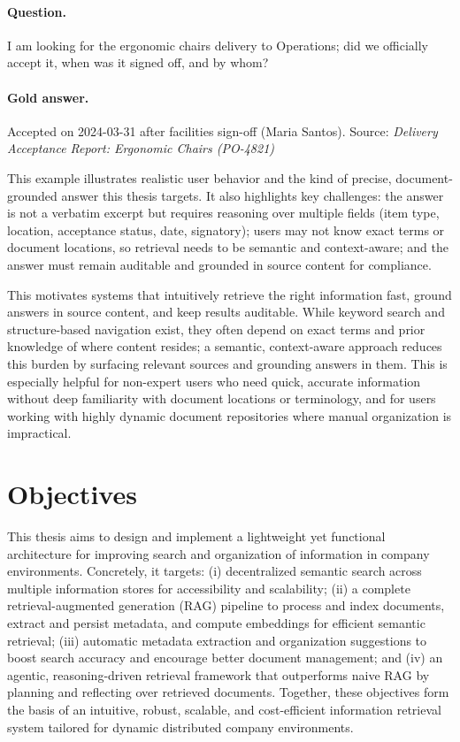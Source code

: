 \paragraph{Question.} I am looking for the ergonomic chairs delivery to Operations; did we officially accept it, when was it signed off, and by whom?

\paragraph{Gold answer.} Accepted on 2024-03-31 after facilities sign-off (Maria Santos). Source: \textit{Delivery Acceptance Report: Ergonomic Chairs (PO-4821)}

This example illustrates realistic user behavior and the kind of precise, document-grounded answer this thesis targets. It also highlights key challenges: the answer is not a verbatim excerpt but requires reasoning over multiple fields (item type, location, acceptance status, date, signatory); users may not know exact terms or document locations, so retrieval needs to be semantic and context-aware; and the answer must remain auditable and grounded in source content for compliance.

This motivates systems that intuitively retrieve the right information fast, ground answers in source content, and keep results auditable. While keyword search and structure-based navigation exist, they often depend on exact terms and prior knowledge of where content resides; a semantic, context-aware approach reduces this burden by surfacing relevant sources and grounding answers in them. This is especially helpful for non-expert users who need quick, accurate information without deep familiarity with document locations or terminology, and for users working with highly dynamic document repositories where manual organization is impractical.

\section{Objectives}
This thesis aims to design and implement a lightweight yet functional architecture for improving search and organization of information in company environments. Concretely, it targets: (i) decentralized semantic search across multiple information stores for accessibility and scalability; (ii) a complete retrieval-augmented generation (\gls{RAG}) pipeline to process and index documents, extract and persist metadata, and compute embeddings for efficient semantic retrieval; (iii) automatic metadata extraction and organization suggestions to boost search accuracy and encourage better document management; and (iv) an agentic, reasoning-driven retrieval framework that outperforms naive \gls{RAG} by planning and reflecting over retrieved documents. Together, these objectives form the basis of an intuitive, robust, scalable, and cost-efficient information retrieval system tailored for dynamic distributed company environments.

